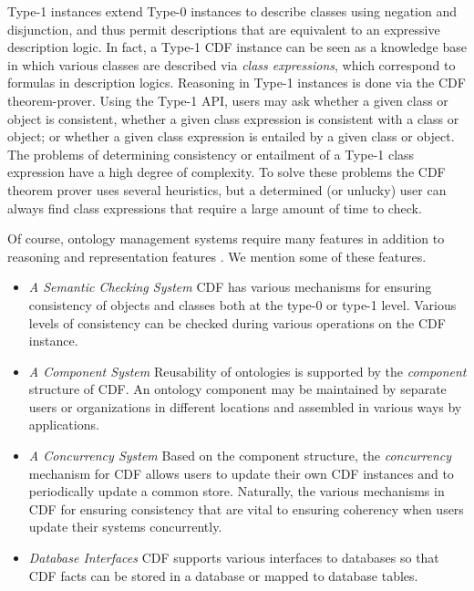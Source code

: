 Type-1 instances extend Type-0 instances to describe classes using
negation and disjunction, and thus permit descriptions that are
equivalent to an expressive description logic.  In fact, a Type-1 CDF
instance can be seen as a knowledge base in which various classes are
described via {\em class expressions}, which correspond to formulas in
description logics.  Reasoning in Type-1 instances is done via the CDF
theorem-prover.  Using the Type-1 API, users may ask whether a given
class or object is consistent, whether a given class expression is
consistent with a class or object; or whether a given class expression
is entailed by a given class or object.  The problems of determining
consistency or entailment of a Type-1 class expression have a high
degree of complexity.  To solve these problems the CDF theorem prover
uses several heuristics, but a determined (or unlucky) user can always
find class expressions that require a large amount of time to check.

Of course, ontology management systems require many features in
addition to reasoning and representation features \cite{MGPS03}.  We
mention some of these features.

\begin{itemize}
\item {\em A Semantic Checking System} CDF has various mechanisms for
ensuring consistency of objects and classes both at the type-0 or
type-1 level.  Various levels of consistency can be checked during
various operations on the CDF instance.
%
\item {\em A Component System} Reusability of ontologies is supported
by the {\em component} structure of CDF.  An ontology component may be
maintained by separate users or organizations in different locations
and assembled in various ways by applications.
%
\item {\em A Concurrency System} Based on the component structure, the
{\em concurrency} mechanism for CDF allows users to update their own
CDF instances and to periodically update a common store. Naturally,
the various mechanisms in CDF for ensuring consistency that are vital
to ensuring coherency when users update their systems concurrently.
%
\item {\em Database Interfaces} CDF supports various interfaces to
databases so that CDF facts can be stored in a database or mapped to
database tables.
\end{itemize}

